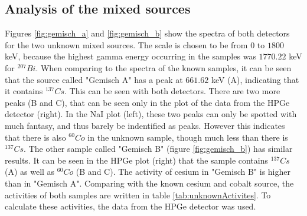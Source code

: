 \documentclass[a4paper]{article}
\begin{document}
\subsection{Analysis of the mixed sources}

Figures \ref{fig:gemisch_a} and \ref{fig:gemisch_b} show the spectra of both detectors for the two unknown mixed sources. The scale is chosen to be from $0$ to $1800$ keV, because the highest gamma energy occurring in the samples was $1770.22$ keV for $^{207}Bi$.
\newline
When comparing to the spectra of the known samples, it can be seen that the source called "Gemisch A" has a peak at $661.62$ keV (A), indicating that it contains $^{137}Cs$. This can be seen with both detectors. There are two more peaks (B and C), that can be seen only in the plot of the data from the HPGe detector (right). In the NaI plot (left), these two peaks can only be spotted with much fantasy, and thus barely be indentified as peaks. However this indicates that there is also $^{60}Co$ in the unknown sample, though much less than there is $^{137}Cs$.
\newline
The other sample called "Gemisch B" (figure \ref{fig:gemisch_b}) has similar results. It can be seen in the HPGe plot (right) that the sample contains $^{137}Cs$ (A) as well as $^{60}Co$ (B and C).
\newline
The activity of cesium in "Gemisch B" is higher than in "Gemisch A". Comparing with the known cesium and cobalt source, the activities of both samples are written in table \ref{tab:unknownActivites}. To calculate these activities, the data from the HPGe detector was used.
\end{document}
